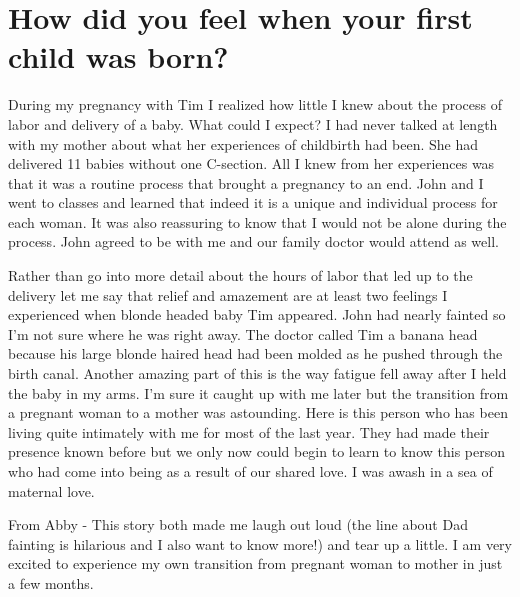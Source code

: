 \section{How did you feel when your first child was born?}
During my pregnancy with Tim I realized how little I knew about the process of labor and delivery of a baby.
What could I expect? I had never talked at length with my mother about what her experiences of childbirth had been.
She had delivered 11 babies without one C-section.
All I knew from her experiences was that it was a routine process that brought a pregnancy to an end.
John and I went to classes and learned that indeed it is a unique and individual process for each woman.
It was also reassuring to know that I would not be alone during the process.
John agreed to be with me and our family doctor would attend as well.

Rather than go into more detail about the hours of labor that led up to the delivery let me say that relief and amazement are at least two feelings I experienced when blonde headed baby Tim appeared.
John had nearly fainted so I'm not sure where he was right away.
The doctor called Tim a banana head because his large blonde haired head had been molded as he pushed through the birth canal.
Another amazing part of this is the way fatigue fell away after I held the baby in my arms.
I'm sure it caught up with me later but the transition from a pregnant woman to a mother was astounding.
Here is this person who has been living quite intimately with me for most of the last year.
They had made their presence known before but we only now could begin to learn to know this person who had come into being as a result of our shared love.
I was awash in a sea of maternal love.

From Abby - This story both made me laugh out loud (the line about Dad fainting is hilarious and I also want to know more!) and tear up a little.
I am very excited to experience my own transition from pregnant woman to mother in just a few months.






